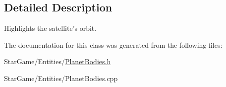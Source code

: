 \subsection{Detailed Description}
Highlights the satellite's orbit. 

The documentation for this class was generated from the following files\-:\begin{DoxyCompactItemize}
\item 
Star\-Game/\-Entities/\hyperlink{_planet_bodies_8h}{Planet\-Bodies.\-h}\item 
Star\-Game/\-Entities/Planet\-Bodies.\-cpp\end{DoxyCompactItemize}

